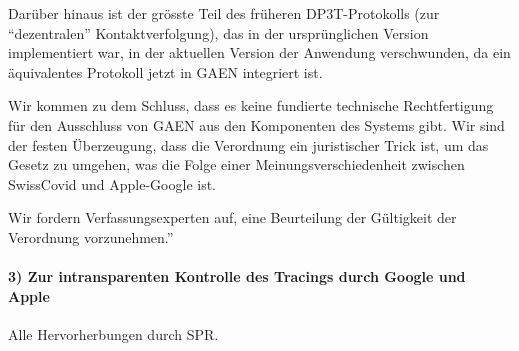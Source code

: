 Darüber hinaus ist der grösste Teil des früheren DP3T-Protokolls (zur
``dezentralen'' Kontakt­verfolgung), das in der ursprünglichen Version
implementiert war, in der aktuellen Version der Anwendung verschwunden,
da ein äquivalentes Protokoll jetzt in GAEN integriert ist.

Wir kommen zu dem Schluss, dass es keine fundierte technische
Rechtfertigung für den Ausschluss von GAEN aus den Komponenten des
Systems gibt. Wir sind der festen Überzeugung, dass die Verordnung ein
juristischer Trick ist, um das Gesetz zu umgehen, was die Folge einer
Meinungs­ver­schiedenheit zwischen SwissCovid und Apple-Google ist.

Wir fordern Verfassungsexperten auf, eine Beurteilung der Gültigkeit der
Verordnung vorzunehmen.''

\hypertarget{3-zur-intransparenten-kontrolle-des-tracings-durch-google-und-apple}{%
\paragraph{3) Zur intransparenten Kontrolle des Tracings durch Google
und
Apple}\label{3-zur-intransparenten-kontrolle-des-tracings-durch-google-und-apple}}

Alle Hervorherbungen durch SPR.

